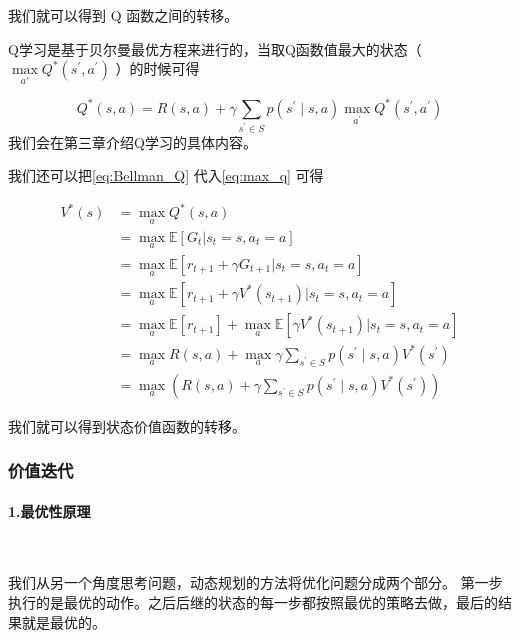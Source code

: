 我们就可以得到 Q 函数之间的转移。


Q学习是基于贝尔曼最优方程来进行的，当取Q函数值最大的状态（ $\underset{a'}{\max} Q^{*}\left(s^{\prime}, a^{\prime}\right)$ ）的时候可得

\begin{equation}
  Q^{*}(s, a)=R(s, a)+\gamma \sum_{s^{\prime} \in S} p\left(s^{\prime} \mid s, a\right) \max _{a^{\prime}} Q^{*}\left(s^{\prime}, a^{\prime}\right)
  \label{eq:}
\end{equation}
我们会在第三章介绍Q学习的具体内容。

我们还可以把\eqref{eq:Bellman_Q} 代入\eqref{eq:max_q} 可得

\begin{equation}
  \begin{aligned}
    V^{*}(s)&=\max _{a} Q^{*}(s, a) \\
    &=\max_{a} \mathbb{E}[G_t|s_t=s,a_t=a]\\  
    &=\max_{a}\mathbb{E}[r_{t+1}+\gamma G_{t+1}|s_t=s,a_t=a]\\
    &=\max_{a}\mathbb{E}[r_{t+1}+\gamma V^*(s_{t+1})|s_t=s,a_t=a]\\
    &=\max_{a}\mathbb{E}[r_{t+1}]+ \max_a \mathbb{E}[\gamma V^*(s_{t+1})|s_t=s,a_t=a]\\
    &=\max_{a} R(s,a) + \max_a\gamma \sum_{s^{\prime} \in S} p\left(s^{\prime} \mid s, a\right) V^{*}\left(s^{\prime}\right)\\
    &=\max_{a} \left(R(s,a) + \gamma \sum_{s^{\prime} \in S} p\left(s^{\prime} \mid s, a\right) V^{*}\left(s^{\prime}\right)\right)
    \end{aligned}
  \label{eq:}
\end{equation}

我们就可以得到状态价值函数的转移。

\subsubsection{价值迭代} 

\paragraph{1.最优性原理}~{}
\newline

我们从另一个角度思考问题，动态规划的方法将优化问题分成两个部分。
第一步执行的是最优的动作。之后后继的状态的每一步都按照最优的策略去做，最后的结果就是最优的。

